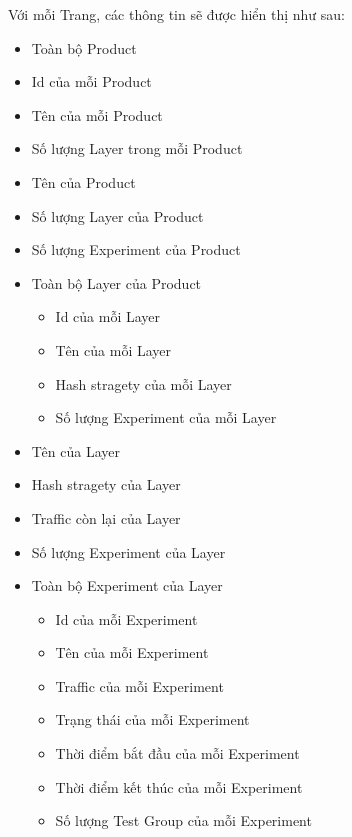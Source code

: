 Với mỗi Trang, các thông tin sẽ được hiển thị như sau:

\begin{itemize}
	\begin{itemize}
		\item Toàn bộ Product
		\item Id của mỗi Product
		\item Tên của mỗi Product
		\item Số lượng Layer trong mỗi Product
	\end{itemize}
	\begin{itemize}
		\item Tên của Product
		\item Số lượng Layer của Product
		\item Số lượng Experiment của Product
		\item Toàn bộ Layer của Product
		      \begin{itemize}
			      \item Id của mỗi Layer
			      \item Tên của mỗi Layer
			      \item Hash stragety của mỗi Layer
			      \item Số lượng Experiment của mỗi Layer
		      \end{itemize}
	\end{itemize}
	\begin{itemize}
		\item Tên của Layer
		\item Hash stragety của Layer
		\item Traffic còn lại của Layer
		\item Số lượng Experiment của Layer
		\item Toàn bộ Experiment của Layer
		      \begin{itemize}
			      \item Id của mỗi Experiment
			      \item Tên của mỗi Experiment
			      \item Traffic của mỗi Experiment
			      \item Trạng thái của mỗi Experiment
			      \item Thời điểm bắt đầu của mỗi Experiment
			      \item Thời điểm kết thúc của mỗi Experiment
			      \item Số lượng Test Group của mỗi Experiment
		      \end{itemize}

\end{itemize}
\end{itemize}
